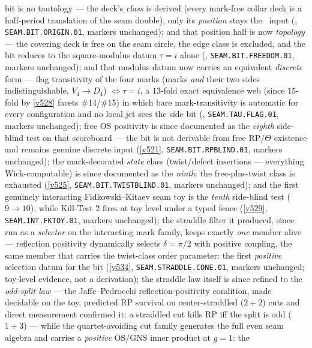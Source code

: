 bit is no tautology --- the deck's \emph{class} is derived (every mark-free collar deck is a
half-period translation of the seam double), only its \emph{position} stays the \mC\ input
(, \texttt{SEAM.BIT.ORIGIN.01}, markers unchanged); and that
position half is now \emph{topology} --- the covering deck is free on the seam circle, the
edge class is excluded, and the bit reduces to the square-modulus datum $\tau=i$ alone
(, \texttt{SEAM.BIT.FREEDOM.01}, markers unchanged); and that
modulus datum now carries an equivalent \emph{discrete} form --- flag transitivity of the four marks
(marks \emph{and} their two sides indistinguishable, $V_4\to D_4$) $\iff\tau=i$, a $13$-fold exact
equivalence web (since $15$-fold by \vref{v528} facets \#14/\#15) in which bare mark-transitivity is
automatic for every configuration and no local
jet sees the side bit (, \texttt{SEAM.TAU.FLAG.01}, markers
unchanged); free OS positivity is since documented as the \emph{eighth} side-blind test on that
scoreboard --- the bit is not derivable from free RP/$\Theta$ existence and remains genuine
discrete input (\vref{v521}, \texttt{SEAM.BIT.RPBLIND.01}, markers unchanged); the
mark-decorated \emph{state} class (twist/defect insertions --- everything Wick-computable)
is since documented as the \emph{ninth}: the free-plus-twist class is exhausted
(\vref{v525}, \texttt{SEAM.BIT.TWISTBLIND.01}, markers unchanged); and the first genuinely
interacting Fidkowski--Kitaev seam toy is the \emph{tenth} side-blind test ($9\to10$), while
Kill-Test 2 fires at toy level under a typed fence (\vref{v529}, \texttt{SEAM.INT.FKTOY.01},
markers unchanged); the straddle filter it produced, since run as a \emph{selector} on the
interacting mark family, keeps exactly \emph{one} member alive --- reflection positivity
dynamically selects $\delta=\pi/2$ with positive coupling, the same member that carries the
twist-class order parameter: the first \emph{positive} selection datum for the bit
(\vref{v534}, \texttt{SEAM.STRADDLE.CONE.01}, markers unchanged; toy-level evidence,
not a derivation); the straddle law itself is since refined to the \emph{odd-split law} ---
the Jaffe--Pedrocchi reflection-positivity condition, made decidable on the toy, predicted RP
survival on center-straddled ($2{+}2$) cuts and direct measurement confirmed it: a straddled
cut kills RP iff the split is odd ($1{+}3$) --- while the quartet-avoiding cut family generates
the full even seam algebra and carries a \emph{positive} OS/GNS inner product at $g=1$: the
